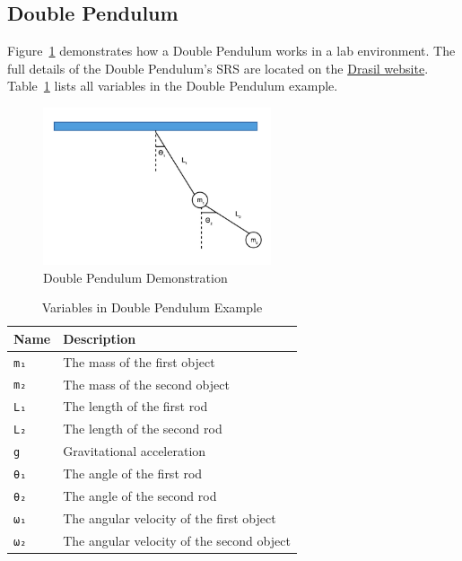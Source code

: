 \subsection{Double Pendulum}
\label{se_dblpen}
Figure~\ref{fig_dblpen} demonstrates how a Double Pendulum works in a lab environment. The full details of the Double Pendulum's SRS are located on the \href{https://jacquescarette.github.io/Drasil/examples/dblpendulum/SRS/srs/DblPendulum_SRS.html}{Drasil website}. Table~\ref{tab_dblpendes} lists all variables in the Double Pendulum example.
\begin{figure}[ht]
  \centering
  \includegraphics[width=0.6\textwidth]{figures/DblPendulum.png}
  \caption{Double Pendulum Demonstration}
  \label{fig_dblpen}
\end{figure}

\begin{table}[ht]
	\begin{tabular}{ p{} p{} }
		\textbf{Name} & \textbf{Description} \\
		\toprule
		\verb|m₁| & The mass of the first object\\
    \verb|m₂| & The mass of the second object\\
		\verb|L₁| & The length of the first rod\\
		\verb|L₂| & The length of the second rod\\
		\verb|g| & Gravitational acceleration\\
		\verb|θ₁| & The angle of the first rod\\
		\verb|θ₂| & The angle of the second rod\\
		\verb|ω₁| & The angular velocity of the first object\\
		\verb|ω₂| & The angular velocity of the second object\\
		\bottomrule	
	\end{tabular}	
	\caption{Variables in Double Pendulum Example}	
	\label{tab_dblpendes}
\end{table}

